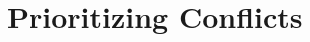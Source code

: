 \documentclass[letterpaper]{article} %
\newcommand\konstantin[1]{\nb{\textbf{Konstantin:}}{red}{#1}}
\newcommand\roni[1]{\nb{\textbf{Roni:}}{orange}{#1}}
\newcommand{\cbs}{\ac{CBS}\xspace}
\newcommand{\cbsds}{{CBS-DS}\xspace}
\newcommand{\mapf}{\ac{MAPF}\xspace}
\newcommand{\pc}{\ac{PC}\xspace}
\newcommand{\ds}{\ac{DS}\xspace}
\begin{document}








\section{Prioritizing Conflicts}





\end{document}
